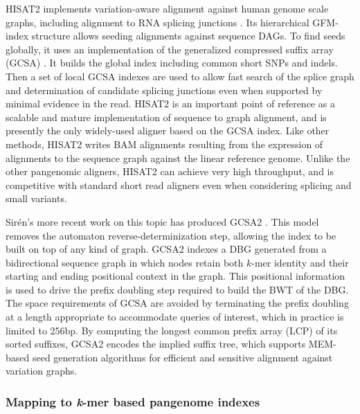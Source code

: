 HISAT2 implements variation-aware alignment against human genome scale graphs, including alignment to RNA splicing junctions \cite{kim2017hisat2}.
Its hierarchical GFM-index structure allows seeding alignments against sequence DAGs.
To find seeds globally, it uses an implementation of the generalized compressed suffix array (GCSA) \cite{siren2011indexing}.
It builds the global index including common short SNPs and indels.
Then a set of local GCSA indexes are used to allow fast search of the splice graph and determination of candidate splicing junctions even when supported by minimal evidence in the read.
HISAT2 is an important point of reference as a scalable and mature implementation of sequence to graph alignment, and is presently the only widely-used aligner based on the GCSA index.
Like other methods, HISAT2 writes BAM alignments resulting from the expression of alignments to the sequence graph against the linear reference genome.
Unlike the other pangenomic aligners, HISAT2 can achieve very high throughput, and is competitive with standard short read aligners even when considering splicing and small variants.

Sir\'{e}n's more recent work on this topic has produced GCSA2 \cite{siren2017indexing}.
This model removes the automaton reverse-determinization step, allowing the index to be built on top of any kind of graph.
GCSA2 indexes a DBG generated from a bidirectional sequence graph in which nodes retain both $k$-mer identity and their starting and ending positional context in the graph.
This positional information is used to drive the prefix doubling step required to build the BWT of the DBG.
The space requirements of GCSA are avoided by terminating the prefix doubling at a length appropriate to accommodate queries of interest, which in practice is limited to 256bp.
By computing the longest common prefix array (LCP) of its sorted suffixes, GCSA2 encodes the implied suffix tree, which supports MEM-based seed generation algorithms for efficient and sensitive alignment against variation graphs.

\subsubsection{Mapping to \emph{k}-mer based pangenome indexes}

